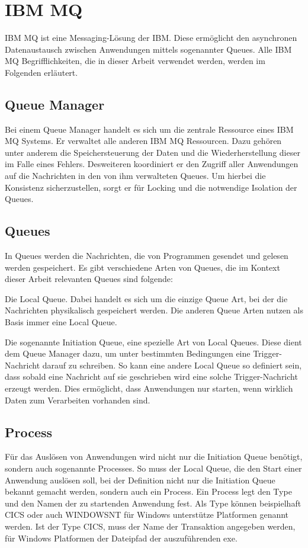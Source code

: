 \section{IBM MQ}\label{sec:mq}
IBM MQ ist eine Messaging-Lösung der IBM.
Diese ermöglicht den asynchronen Datenaustausch zwischen Anwendungen mittels sogenannter Queues.
Alle IBM MQ Begrifflichkeiten, die in dieser Arbeit verwendet werden, werden im Folgenden erläutert.
\cite{Aranha.2013}

\subsection{Queue Manager}
Bei einem Queue Manager handelt es sich um die zentrale Ressource eines IBM MQ Systems.
Er verwaltet  alle anderen IBM MQ Ressourcen.
Dazu gehören unter anderem die Speichersteuerung der Daten und die Wiederherstellung dieser im Falle eines Fehlers.
Desweiteren koordiniert er den Zugriff aller Anwendungen auf die Nachrichten in den von ihm verwalteten Queues.
Um hierbei die Konsistenz sicherzustellen, sorgt er für Locking und die notwendige Isolation der Queues.
\cite{Aranha.2013}

\subsection{Queues}
In Queues werden die Nachrichten, die von Programmen gesendet und gelesen werden gespeichert.
Es gibt verschiedene Arten von Queues, die im Kontext dieser Arbeit relevanten Queues sind folgende:

Die Local Queue.
Dabei handelt es sich um die einzige Queue Art, bei der die Nachrichten physikalisch gespeichert werden.
Die anderen Queue Arten nutzen als Basis immer eine Local Queue.

Die sogenannte \glqq Initiation Queue\grqq, eine spezielle Art von Local Queues.
Diese dient dem Queue Manager dazu, um unter bestimmten Bedingungen eine Trigger-Nachricht darauf zu schreiben.
So kann eine andere Local Queue so definiert sein, dass sobald eine Nachricht auf sie geschrieben wird eine solche Trigger-Nachricht erzeugt werden.
Dies ermöglicht, dass Anwendungen nur starten, wenn wirklich Daten zum Verarbeiten vorhanden sind.
\cite{Aranha.2013}

\subsection{Process}
Für das Auslösen von Anwendungen wird nicht nur die Initiation Queue benötigt, sondern auch sogenannte \glqq Processes\grqq.
So muss der Local Queue, die den Start einer Anwendung auslösen soll, bei der Definition nicht nur die Initiation Queue bekannt gemacht werden, sondern auch ein Process.
Ein Process legt den \glqq Type\grqq{} und den Namen der zu startenden Anwendung fest.
Als \glqq Type\grqq{} können beispielhaft CICS oder auch WINDOWSNT für Windows unterstütze Platformen genannt werden.
Ist der \glqq Type\grqq{} CICS,  muss der Name der Transaktion angegeben werden, für Windows Platformen der Dateipfad der auszuführenden exe.
\cite{Aranha.2013}

